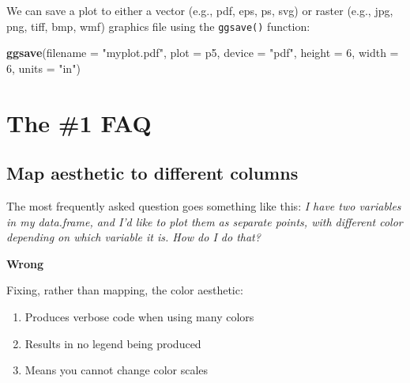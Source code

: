 \documentclass[
]{book}
\newenvironment{Shaded}{\begin{snugshade}}{\end{snugshade}}
\newcommand{\DataTypeTok}[1]{\textcolor[rgb]{0.13,0.29,0.53}{#1}}
\newcommand{\DecValTok}[1]{\textcolor[rgb]{0.00,0.00,0.81}{#1}}
\newcommand{\KeywordTok}[1]{\textcolor[rgb]{0.13,0.29,0.53}{\textbf{#1}}}
\newcommand{\NormalTok}[1]{#1}
\newcommand{\StringTok}[1]{\textcolor[rgb]{0.31,0.60,0.02}{#1}}
\providecommand{\tightlist}{%
  \setlength{\itemsep}{0pt}\setlength{\parskip}{0pt}}
\begin{document}
We can save a plot to either a vector (e.g., pdf, eps, ps, svg)
or raster (e.g., jpg, png, tiff, bmp, wmf) graphics file using
the \texttt{ggsave()} function:

\begin{Shaded}
\begin{Highlighting}[]
\KeywordTok{ggsave}\NormalTok{(}\DataTypeTok{filename =} \StringTok{"myplot.pdf"}\NormalTok{, }\DataTypeTok{plot =}\NormalTok{ p5, }\DataTypeTok{device =} \StringTok{"pdf"}\NormalTok{, }\DataTypeTok{height =} \DecValTok{6}\NormalTok{, }\DataTypeTok{width =} \DecValTok{6}\NormalTok{, }\DataTypeTok{units =} \StringTok{"in"}\NormalTok{)}
\end{Highlighting}
\end{Shaded}

\hypertarget{the-1-faq}{%
\section{The \#1 FAQ}\label{the-1-faq}}

\hypertarget{map-aesthetic-to-different-columns}{%
\subsection{Map aesthetic to different columns}\label{map-aesthetic-to-different-columns}}

The most frequently asked question goes something like this: \emph{I have two variables in my data.frame, and I'd like to plot them as separate points, with different color depending on which variable it is. How do I do that?}

\textbf{Wrong}

Fixing, rather than mapping, the color aesthetic:

\begin{enumerate}
\def\labelenumi{\arabic{enumi}.}
\tightlist
\item
  Produces verbose code when using many colors
\item
  Results in no legend being produced
\item
  Means you cannot change color scales
\end{enumerate}
\end{document}
